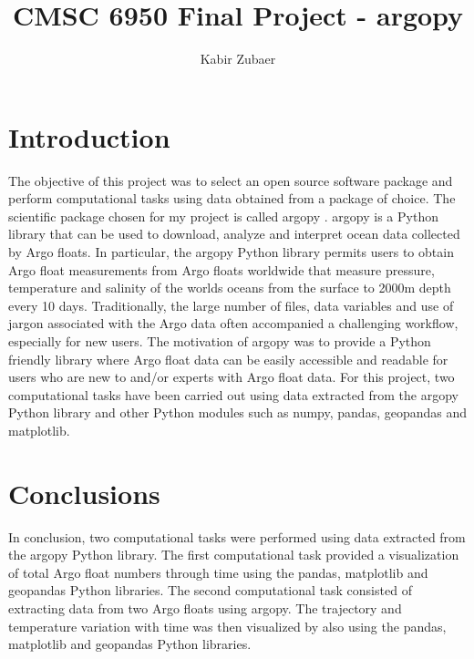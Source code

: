 \documentclass{article}
\title{CMSC 6950 Final Project - argopy}
\author{Kabir Zubaer}
\begin{document}
\maketitle

\section{Introduction}

The objective of this project was to select an open source software package and perform computational tasks using data obtained from a package of choice. The scientific package chosen for my project is called argopy \cite{maze2020argopy}. argopy is a Python library that can be used to download, analyze and interpret ocean data collected by Argo floats. In particular, the argopy Python library permits users to obtain Argo float measurements from Argo floats worldwide that measure pressure, temperature and salinity of the worlds oceans from the surface to 2000m depth every 10 days. Traditionally, the large number of files, data variables and use of jargon associated with the Argo data often accompanied a challenging workflow, especially for new users. The motivation of argopy was to provide a Python friendly library where Argo float data can be easily accessible and readable for users who are new to and/or experts with Argo float data. For this project, two computational tasks have been carried out using data extracted from the argopy Python library and other Python modules such as numpy, pandas, geopandas and matplotlib. 

    
 

\section{Conclusions}

In conclusion, two computational tasks were performed using data extracted from the argopy Python library. The first computational task provided a visualization of total Argo float numbers through time using the pandas, matplotlib and geopandas Python libraries. The second computational task consisted of extracting data from two Argo floats using argopy. The trajectory and temperature variation with time was then visualized by also using the pandas, matplotlib and geopandas Python libraries.


\end{document}
